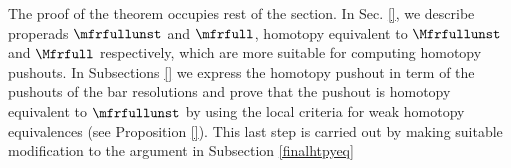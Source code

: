 \documentclass[a4paper,10pt]{amsart}
\begin{document}
The proof of the theorem occupies rest of the section. In Sec. \ref{}, we describe properads $\mfrfullunst$ and $\mfrfull$, homotopy equivalent to $\Mfrfullunst$ and $\Mfrfull$ respectively, which are more suitable for computing homotopy pushouts. In Subsections \ref{} we express the homotopy pushout in term of the pushouts of the bar resolutions and prove that the pushout is homotopy equivalent to $\mfrfullunst$ by using the local criteria for weak homotopy equivalences (see Proposition \ref{}). This last step is carried out by making suitable modification to the argument in Subsection \ref{finalhtpyeq}

\end{document}
